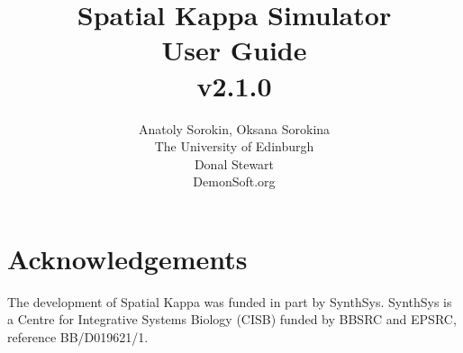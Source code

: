 \documentclass[a4paper]{report}
\title{Spatial Kappa Simulator\\User Guide\\v2.1.0}
\author{Anatoly Sorokin, Oksana Sorokina\\The University of Edinburgh\\Donal Stewart\\DemonSoft.org}
\begin{document}
\maketitle

\section*{Acknowledgements}

The development of Spatial Kappa was funded in part by SynthSys. SynthSys is a Centre for Integrative Systems Biology (CISB) funded by BBSRC and EPSRC, reference BB/D019621/1.

\tableofcontents





\appendix





\end{document}
